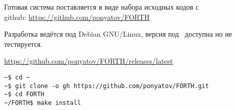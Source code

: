 
\noindent
Готовая система поставляется в виде набора исходных кодов с\\
github: \url{https://github.com/ponyatov/FORTH}

\bigskip
Разработка ведётся под Debian GNU/Linux, версия под \win\ доступна но не
тестируется.

\subsecly{\win}

\url{https://github.com/ponyatov/FORTH/releases/latest}

\subsecly{\lin}

\begin{verbatim}
~$ cd ~
~$ git clone -o gh https://github.com/ponyatov/FORTH.git
~$ cd FORTH
~/FORTH$ make install
\end{verbatim}

